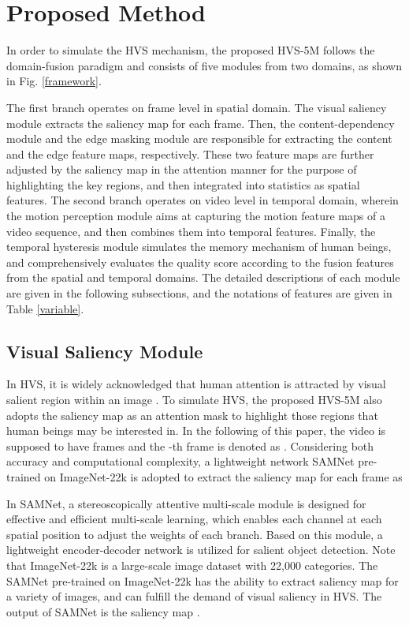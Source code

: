 \documentclass[journal]{IEEEtran}
\begin{document}
\section{Proposed Method} \label{proposed method}


In order to simulate the HVS mechanism, the proposed HVS-5M follows the domain-fusion paradigm and consists of five modules from two domains, as shown in Fig. \ref{framework}.

The first branch operates on frame level in spatial domain.
The visual saliency module extracts the saliency map for each frame.
Then, the content-dependency module and the edge masking module are responsible for extracting the content and the edge feature maps, respectively. These two feature maps are further adjusted by the saliency map in the attention manner for the purpose of highlighting the key regions, and then integrated into statistics as spatial features.
The second branch operates on video level in temporal domain, wherein the motion perception module aims at capturing the motion feature maps of a video sequence, and then combines them into temporal features.
Finally, the temporal hysteresis module simulates the memory mechanism of human beings,
and comprehensively evaluates the quality score according to the fusion features
from the spatial and temporal domains.
The detailed descriptions of each module are given in the following subsections, and the notations of features are given in Table \ref{variable}.



\subsection{Visual Saliency Module}

In HVS, it is widely acknowledged that human attention is attracted by visual salient region within an image \cite{Visual Saliency1,Visual Saliency2}.
To simulate HVS, the proposed HVS-5M also adopts the saliency map as an attention mask to highlight those regions that human beings may be interested in.
In the following of this paper, the video is supposed to have  frames and the -th frame is denoted as .
Considering both accuracy and computational complexity,
a lightweight network SAMNet \cite{SAMNet} pre-trained on ImageNet-22k \cite{ImageNet} is adopted to extract the saliency map  for each frame as

In SAMNet, a stereoscopically attentive multi-scale module is designed for effective and efficient multi-scale learning,
which enables each channel at each spatial position to adjust the weights of each branch.
Based on this module, a lightweight encoder-decoder network is utilized for salient object detection.
Note that ImageNet-22k is a large-scale image dataset with 22,000 categories.
The SAMNet pre-trained on ImageNet-22k has the ability to extract saliency map for a variety of images, and can fulfill the demand of visual saliency in HVS.
The output of SAMNet is the saliency map .
\end{document}
